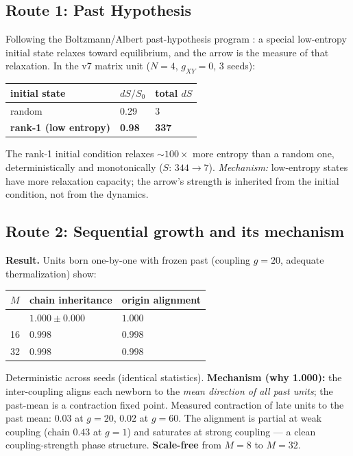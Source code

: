 \documentclass[12pt,a4paper]{article}
\newcounter{none}
\begin{document}
\subsection{Route 1: Past
Hypothesis}\label{route-1-past-hypothesis}

Following the Boltzmann/Albert past-hypothesis program
\cite{albert_2000}: a special low-entropy initial state relaxes
toward equilibrium, and the arrow is the measure of that relaxation. In
the v7 matrix unit (\(N=4\), \(g_{XY}=0\), 3 seeds):

{\def\LTcaptype{none} %
\begin{longtable}[]{@{}lll@{}}
\toprule\noalign{}
initial state & \(dS/S_0\) & total \(dS\) \\
\midrule\noalign{}
\endhead
\bottomrule\noalign{}
\endlastfoot
random & 0.29 & 3 \\
\textbf{rank-1 (low entropy)} & \textbf{0.98} & \textbf{337} \\
\end{longtable}
}

The rank-1 initial condition relaxes \(\sim100\times\) more entropy than
a random one, deterministically and monotonically (\(S\): \(344\to7\)).
\emph{Mechanism:} low-entropy states have more relaxation capacity; the
arrow's strength is inherited from the initial condition, not from the
dynamics.

\subsection{Route 2: Sequential growth and its
mechanism}\label{route-2-sequential-growth-and-its-mechanism}

\textbf{Result.} Units born one-by-one with frozen past (coupling
\(g=20\), adequate thermalization) show:

{\def\LTcaptype{none} %
\begin{longtable}[]{@{}lll@{}}
\toprule\noalign{}
\(M\) & chain inheritance & origin alignment \\
\midrule\noalign{}
\endhead
\bottomrule\noalign{}
\endlastfoot
8 & \(1.000 \pm 0.000\) & \(1.000\) \\
16 & \(0.998\) & \(0.998\) \\
32 & \(0.998\) & \(0.998\) \\
\end{longtable}
}

Deterministic across seeds (identical statistics). \textbf{Mechanism
(why 1.000):} the inter-coupling aligns each newborn to the \emph{mean
direction of all past units}; the past-mean is a contraction fixed
point. Measured contraction of late units to the past mean: \(0.03\) at
\(g=20\), \(0.02\) at \(g=60\). The alignment is partial at weak
coupling (chain \(0.43\) at \(g=1\)) and saturates at strong coupling
--- a clean coupling-strength phase structure. \textbf{Scale-free} from
\(M=8\) to \(M=32\).
\end{document}
